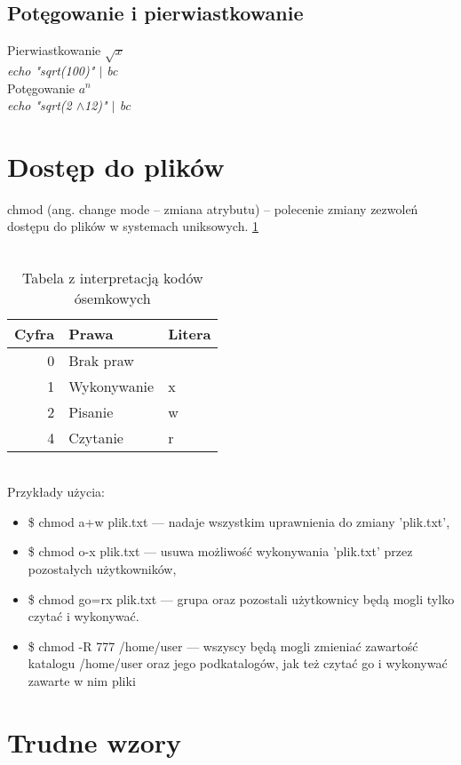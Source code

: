 \documentclass[a4paper,11pt]{article}
\begin{document}
\subsection{Potęgowanie i pierwiastkowanie}
Pierwiastkowanie $\sqrt{x}$ \\
\textit{echo "sqrt(100)" $|$ bc} \\
Potęgowanie $a^{n}$ \\
\textit{echo "sqrt(2 $\land$12)" $|$ bc} \\

\section{Dostęp do plików}
chmod (ang. change mode – zmiana atrybutu) – polecenie zmiany zezwoleń dostępu do plików w systemach uniksowych. \cite{c} \ref{tab:jeden} \\ \\
\begin{table}[h]
\centering
\begin{tabular}{|r|l|l|} \hline
\textbf{Cyfra} & \textbf{Prawa} & \textbf{Litera}\\ \hline
0 &	Brak praw &  \\ \hline
1 &	Wykonywanie & x\\ \hline 
2 &	Pisanie & w\\ \hline
4 & Czytanie & r \\ \hline
\end{tabular} 
\caption{Tabela z interpretacją kodów ósemkowych}\label{tab:jeden}
\end{table} \\

Przykłady użycia: 
\begin{itemize}
\item \$ chmod a+w plik.txt — nadaje wszystkim uprawnienia do zmiany 'plik.txt',
\item \$ chmod o-x plik.txt — usuwa możliwość wykonywania 'plik.txt' przez pozostałych użytkowników,
\item \$ chmod go=rx plik.txt — grupa oraz pozostali użytkownicy będą mogli tylko czytać i wykonywać.
\item \$ chmod -R 777 /home/user — wszyscy będą mogli zmieniać zawartość katalogu /home/user oraz jego podkatalogów, jak też czytać go i wykonywać zawarte w nim pliki
\end{itemize}

\section{Trudne wzory}
\end{document}
